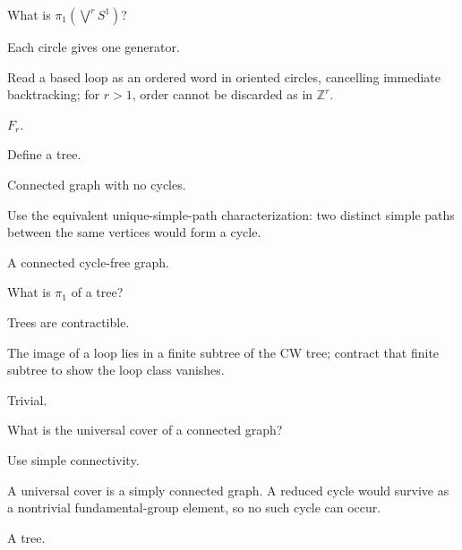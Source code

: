 \begin{exercise}\label{exr:viii14-09}
What is \(\pi_1(\bigvee^rS^1)\)?
\end{exercise}
\begin{hint}
Each circle gives one generator.

Read a based loop as an ordered word in oriented circles, cancelling immediate backtracking; for \(r>1\), order cannot be discarded as in \(\mathbb Z^r\).
\end{hint}
\begin{solution}
\(F_r\).
\end{solution}

\begin{exercise}\label{exr:viii14-10}
Define a tree.
\end{exercise}
\begin{hint}
Connected graph with no cycles.

Use the equivalent unique-simple-path characterization: two distinct simple paths between the same vertices would form a cycle.
\end{hint}
\begin{solution}
A connected cycle-free graph.
\end{solution}

\begin{exercise}\label{exr:viii14-11}
What is \(\pi_1\) of a tree?
\end{exercise}
\begin{hint}
Trees are contractible.

The image of a loop lies in a finite subtree of the CW tree; contract that finite subtree to show the loop class vanishes.
\end{hint}
\begin{solution}
Trivial.
\end{solution}

\begin{exercise}\label{exr:viii14-12}
What is the universal cover of a connected graph?
\end{exercise}
\begin{hint}
Use simple connectivity.

A universal cover is a simply connected graph. A reduced cycle would survive as a nontrivial fundamental-group element, so no such cycle can occur.
\end{hint}
\begin{solution}
A tree.
\end{solution}

